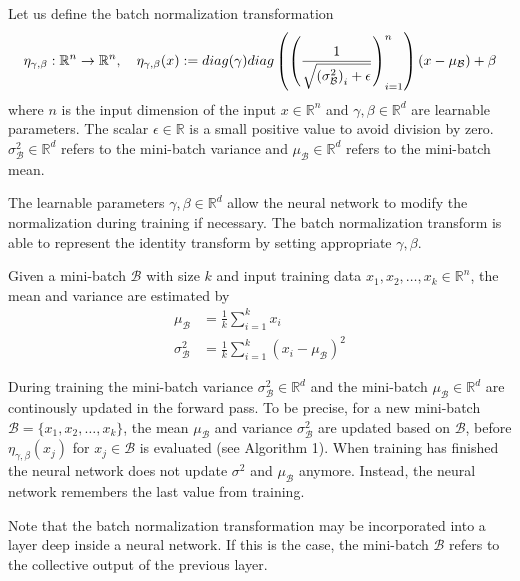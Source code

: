 \documentclass[twoside,a4paper]{article}
\begin{document}

Let us define the batch normalization transformation
\begin{equation*}
	\eta_{\gamma, \beta} : \mathbb{R}^n \to \mathbb{R}^n,\quad
	\eta_{\gamma, \beta}(x) 
	:= diag(\gamma)diag \left( \left( \frac{1}{\sqrt{\left( \sigma^2_\mathcal{B} \right)_i + \epsilon}} \right)_{i=1}^n \right) 
	(x-\mu_\mathcal{B}) + \beta
\end{equation*}
where $n$ is the input dimension of the input $x \in \mathbb{R}^n$ and $\gamma, \beta \in \mathbb{R}^{d}$ 
are learnable parameters.
The scalar $\epsilon \in \mathbb{R}$ is a small positive value to avoid division by zero.
$\sigma^2_\mathcal{B} \in \mathbb{R}^{d}$ refers to the mini-batch variance and
$\mu_\mathcal{B} \in \mathbb{R}^{d}$ refers to the mini-batch mean.

The learnable parameters $\gamma, \beta \in \mathbb{R}^{d}$ allow the neural network to modify
the normalization during training if necessary. The batch normalization transform is able to 
represent the identity transform by setting appropriate $\gamma, \beta$.

Given a mini-batch $\mathcal{B}$ with size $k$ and input training data 
$x_1, x_2, \dots, x_k \in \mathbb{R}^{n}$, the
mean and variance are estimated by
\begin{align*}
	\mu_\mathcal{B} &= \frac{1}{k} \sum_{i=1}^{k} x_i \\
	\sigma^2_\mathcal{B} &= \frac{1}{k} \sum_{i=1}^{k} (x_i - \mu_\mathcal{B})^2
\end{align*}

During training the mini-batch variance $\sigma^2_\mathcal{B} \in \mathbb{R}^{d}$ and
the mini-batch $\mu_\mathcal{B} \in \mathbb{R}^{d}$ are continously updated in the forward pass.
To be precise, for a new mini-batch $\mathcal{B} = \{ x_1, x_2, \dots, x_k \}$, 
the mean $\mu_\mathcal{B}$ and variance $\sigma^2_\mathcal{B}$
are updated based on $\mathcal{B}$, before $\eta_{\gamma, \beta}(x_j)$ for
$x_j \in \mathcal{B}$ is evaluated (see Algorithm 1).
When training has finished the neural network does not update $\sigma^2$ and $\mu_\mathcal{B}$ anymore.
Instead, the neural network remembers the last value from training.

Note that the batch normalization transformation may be incorporated into a layer
deep inside a neural network. 
If this is the case, the mini-batch $\mathcal{B}$ refers to the collective output of the previous layer.
\end{document}
